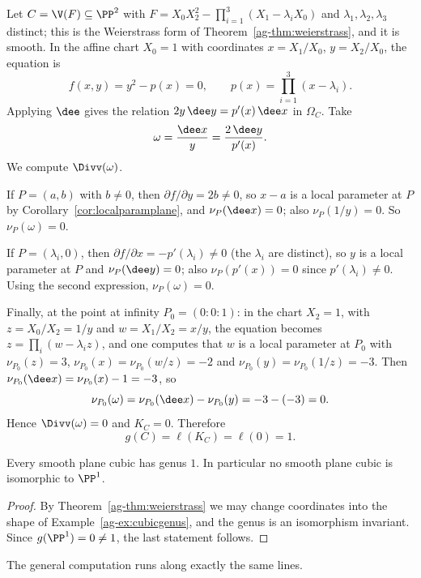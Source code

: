 \begin{example}\label{ag-ex:cubicgenus}
	Let $C = \V(F) \subseteq \PP^2$ with $F = X_0X_2^2 - \prod_{i=1}^3(X_1 - \lambda_iX_0)$ and $\lambda_1,\lambda_2,\lambda_3$ distinct; this is the Weierstrass form of Theorem~\ref{ag-thm:weierstrass}, and it is smooth. In the affine chart $X_0 = 1$ with coordinates $x = X_1/X_0$, $y = X_2/X_0$, the equation is
	$$f(x,y) = y^2 - p(x) = 0, \qquad p(x) = \prod_{i=1}^3(x - \lambda_i).$$
	Applying $\dee$ gives the relation $2y\,\dee y = p'(x)\,\dee x$ in $\Omega_C$. Take
	$$\omega = \frac{\dee x}{y} = \frac{2\,\dee y}{p'(x)}.$$
	We compute $\Divv(\omega)$.

	If $P = (a,b)$ with $b \neq 0$, then $\partial f/\partial y = 2b \neq 0$, so $x - a$ is a local parameter at $P$ by Corollary~\ref{cor:localparamplane}, and $\nu_P(\dee x) = 0$; also $\nu_P(1/y) = 0$. So $\nu_P(\omega) = 0$.

	If $P = (\lambda_i,0)$, then $\partial f/\partial x = -p'(\lambda_i)\neq 0$ (the $\lambda_i$ are distinct), so $y$ is a local parameter at $P$ and $\nu_P(\dee y) = 0$; also $\nu_P(p'(x)) = 0$ since $p'(\lambda_i)\neq0$. Using the second expression, $\nu_P(\omega) = 0$.

	Finally, at the point at infinity $P_0 = (0:0:1)$: in the chart $X_2 = 1$, with $z = X_0/X_2 = 1/y$ and $w = X_1/X_2 = x/y$, the equation becomes $z = \prod_i(w-\lambda_iz)$, and one computes that $w$ is a local parameter at $P_0$ with $\nu_{P_0}(z) = 3$, $\nu_{P_0}(x) = \nu_{P_0}(w/z) = -2$ and $\nu_{P_0}(y) = \nu_{P_0}(1/z) = -3$. Then $\nu_{P_0}(\dee x) = \nu_{P_0}(x) - 1 = -3$, so
	$$\nu_{P_0}(\omega) = \nu_{P_0}(\dee x) - \nu_{P_0}(y) = -3 - (-3) = 0.$$
	Hence $\Divv(\omega) = 0$ and $K_C = 0$. Therefore
	$$g(C) = \ell(K_C) = \ell(0) = 1.$$
\end{example}

\begin{theorem}\label{thm:cubicgenus1}
	Every smooth plane cubic has genus $1$. In particular no smooth plane cubic is isomorphic to $\PP^1$.
\end{theorem}

\begin{proof}
	By Theorem~\ref{ag-thm:weierstrass} we may change coordinates into the shape of Example~\ref{ag-ex:cubicgenus}, and the genus is an isomorphism invariant. Since $g(\PP^1) = 0 \neq 1$, the last statement follows.
\end{proof}

The general computation runs along exactly the same lines.


